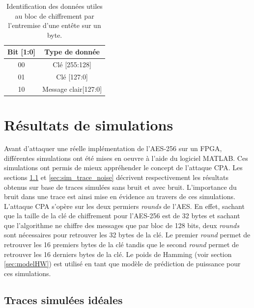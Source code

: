 \documentclass[oneside]{book}
\begin{document}
\begin{table}[htbp]
	\centering
	\begin{tabular}{|c|c|}
    		\hline
  		  \textbf{Bit [1:0]} &\textbf{ Type de donnée} \\ \hline 
		  00 & Clé [255:128] \\ \hline 
  		  01 & Clé [127:0]  \\ \hline 
 		  10 & Message clair[127:0] \\ \hline
	\end{tabular}
    	\caption{Identification des données utiles au bloc de chiffrement par l'entremise d'une entête sur un byte.}
    	\label{tab:header} 
\end{table}
 
\newpage



\section{Résultats de simulations}
\label{sec:Sim_results_CPA}

Avant d'attaquer une réelle implémentation de l'AES-256 sur un FPGA, différentes simulations ont été mises en oeuvre à l'aide du logiciel MATLAB. Ces simulations ont permis de mieux appréhender le concept de l'attaque CPA. Les sections \ref{sec:sim_trace} et \ref{sec:sim_trace_noise} décrivent respectivement les résultats obtenus sur base de traces simulées sans bruit et avec bruit. L'importance du bruit dans une trace est ainsi mise en évidence au travers de ces simulations. L'attaque CPA s'opère sur les deux permiers \textit{rounds} de l'AES. En effet, sachant que la taille de la clé de chiffrement pour l'AES-256 est de 32 bytes et sachant que l'algorithme ne chiffre des messages que par bloc de 128 bits, deux \textit{rounds} sont nécessaires pour retrouver les 32 bytes de la clé. Le premier \textit{round} permet de retrouver les 16 premiers bytes de la clé tandis que le second \textit{round} permet de retrouver les 16 derniers bytes de la clé. Le poids de Hamming (voir section \ref{sec:modelHW}) est utilisé en tant que modèle de prédiction de puissance pour ces simulations.

\subsection{Traces simulées idéales}
\label{sec:sim_trace}
\end{document}
